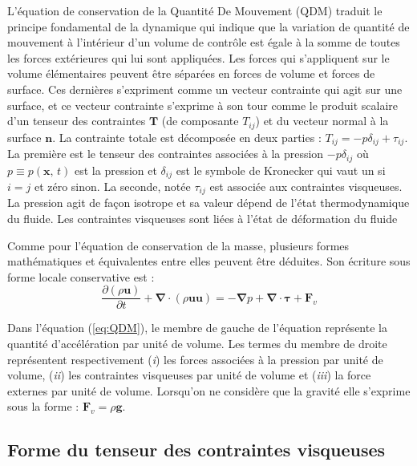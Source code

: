 L'\'equation de conservation de la Quantit\'e De Mouvement (QDM) traduit
le principe fondamental de la dynamique qui indique que la variation
de quantit\'e de mouvement \`a l'int\'erieur d'un volume de contr\^ole est
\'egale \`a la somme de toutes les forces ext\'erieures qui lui sont appliqu\'ees.
Les forces qui s'appliquent sur le volume \'el\'ementaires peuvent \^etre
s\'epar\'ees en forces de volume et forces de surface. Ces derni\`eres s'expriment
comme un vecteur contrainte qui agit sur une surface, et ce vecteur
contrainte s'exprime \`a son tour comme le produit scalaire d'un tenseur
des contraintes $\mathbf{T}$ (de composante $T_{ij}$) et du vecteur
normal \`a la surface $\mathbf{n}$. La contrainte totale est d\'ecompos\'ee
en deux parties : $T_{ij}=-p\delta_{ij}+\tau_{ij}$. La premi\`ere est
le tenseur des contraintes associ\'ees \`a la pression $-p\delta_{ij}$
o\`u $p\equiv p(\mathbf{x},\,t)$ est la pression et $\delta_{ij}$
est le symbole de Kronecker qui vaut un si $i=j$ et z\'ero sinon. La
seconde, not\'ee $\tau_{ij}$ est associ\'ee aux contraintes visqueuses.
La pression agit de fa\c con isotrope et sa valeur d\'epend de l'\'etat thermodynamique
du fluide. Les contraintes visqueuses sont li\'ees \`a l'\'etat de d\'eformation
du fluide

Comme pour l'\'equation de conservation de la masse, plusieurs formes
math\'ematiques et \'equivalentes entre elles peuvent \^etre d\'eduites. Son
\'ecriture sous forme locale conservative est :
\begin{equation}
\frac{\partial(\rho\mathbf{u})}{\partial t}+\boldsymbol{\nabla}\cdot(\rho\mathbf{u}\mathbf{u})=-\boldsymbol{\nabla}p+\boldsymbol{\nabla}\cdot\boldsymbol{\tau}+\mathbf{F}_{v}\label{eq:QDM}
\end{equation}


Dans l'\'equation (\ref{eq:QDM}), le membre de gauche de l'\'equation
repr\'esente la quantit\'e d'acc\'el\'eration par unit\'e de volume. Les termes
du membre de droite repr\'esentent respectivement (\emph{i}) les forces
associ\'ees \`a la pression par unit\'e de volume, (\emph{ii}) les contraintes
visqueuses par unit\'e de volume et (\emph{iii}) la force externes par
unit\'e de volume. Lorsqu'on ne consid\`ere que la gravit\'e elle s'exprime
sous la forme : $\mathbf{F}_{v}=\rho\mathbf{g}$.


\subsection{Forme du tenseur des contraintes visqueuses}

